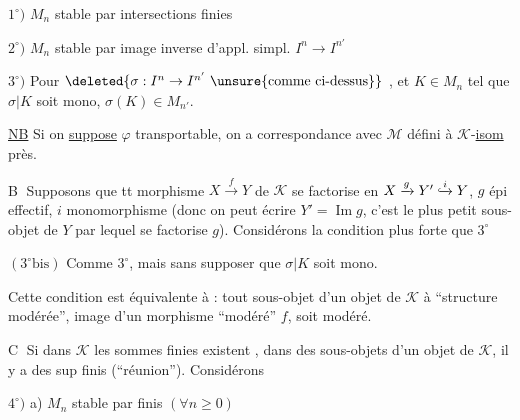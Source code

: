 $1^\circ)$ $M_n$ stable par intersections finies

$2^\circ)$ $M_n$ stable par image inverse d'appl. simpl. $I^n\to I^{n'}$

$3^\circ)$ Pour $\deleted{\sigma:I^n\to I^{n'}\ \unsure{\text{comme ci-dessus}}}$ , et $K\in M_n$ tel que $\sigma|K$ soit mono, $\sigma(K)\in M_{n'}$.

\uline{NB} Si on \uline{suppose} $\varphi$ transportable, on a correspondance avec $\mathcal M$ défini à $\mathcal K$-\uline{isom} près.

\textcircled{B} Supposons que tt morphisme $X\xrightarrow{f}Y$ de $\mathcal K$ se factorise en $X\xrightarrow{g}Y'\lhook\joinrel\xrightarrow{i}Y$, $g$ épi effectif, $i$ monomorphisme (donc on peut écrire $Y'=\operatorname{Im}g$, c'est le plus petit sous-objet de $Y$ par lequel se factorise $g$).
Considérons la condition plus forte que $3^\circ$

$(3^\circ\text{bis})$ Comme $3^\circ$, mais sans supposer que $\sigma|K$ soit mono.

Cette condition est équivalente à : tout sous-objet d'un objet de $\mathcal K$ à ``structure modérée'', image d'un morphisme ``modéré'' $f$, soit modéré.


\textcircled{C} Si dans $\mathcal K$ les sommes finies existent , dans  des sous-objets d'un objet de $\mathcal K$, il y a des sup finis (``réunion''). Considérons

$4^\circ)$ a) $M_n$ stable par   finis $(\forall n\geq0)$ \deleted{$\unsure{\varnothing}$}

